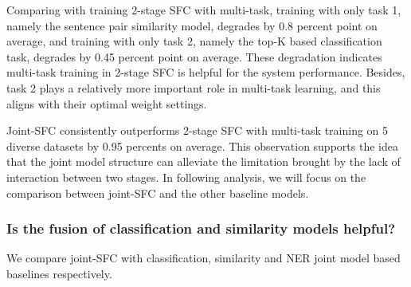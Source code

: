 Comparing with training 2-stage SFC with multi-task, training with only task
1, namely the sentence pair similarity model, degrades by 0.8 percent
point on average, and training with only task 2, namely the top-K based
classification task, degrades by 0.45 percent point on average. These
degradation indicates multi-task training in 2-stage SFC is helpful for the
system performance. Besides, task 2 plays a relatively more important role in
multi-task learning, and this aligns with their optimal weight settings.

Joint-SFC consistently outperforms 2-stage SFC with multi-task training 
on 5 diverse datasets by 0.95 percents on average. 
This observation supports the idea that the joint model
structure can alleviate the limitation brought by the lack of interaction
between two stages. In following analysis, we will focus on the comparison
between joint-SFC and the other baseline models.

\subsubsection*{Is the fusion of classification and similarity models
helpful?} We compare joint-SFC with classification, similarity and NER joint model based baselines respectively.

\begin{table}
  \begin{centering}
  \end{centering}
  \caption{
    We show the performances of SFC from different settings of
    hyperparameters, $K$ denoting the candidate class number from stage 1,
    $P$ denoting the number of sampled sentence pair in stage 2. 
  }
  \label{tbe:table3}
\end{table}

